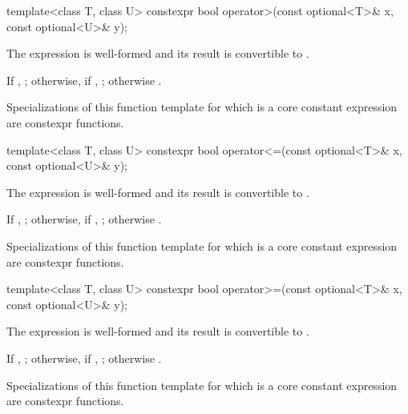 %
\begin{itemdecl}
template<class T, class U>
  constexpr bool operator>(const optional<T>& x, const optional<U>& y);
\end{itemdecl}

\begin{itemdescr}
\pnum
\constraints
The expression  is well-formed and its result is convertible to .

\pnum
\returns
If , ; otherwise, if , ; otherwise .

\pnum
\remarks
Specializations of this function template for which  is a core constant expression are constexpr functions.
\end{itemdescr}

%
\begin{itemdecl}
template<class T, class U>
  constexpr bool operator<=(const optional<T>& x, const optional<U>& y);
\end{itemdecl}

\begin{itemdescr}
\pnum
\constraints
The expression  is well-formed and its result is convertible to .

\pnum
\returns
If , ; otherwise, if , ; otherwise .

\pnum
\remarks
Specializations of this function template for which  is a core constant expression are constexpr functions.
\end{itemdescr}

%
\begin{itemdecl}
template<class T, class U>
  constexpr bool operator>=(const optional<T>& x, const optional<U>& y);
\end{itemdecl}

\begin{itemdescr}
\pnum
\constraints
The expression  is well-formed and its result is convertible to .

\pnum
\returns
If , ; otherwise, if , ; otherwise .

\pnum
\remarks
Specializations of this function template for which  is a core constant expression are constexpr functions.
\end{itemdescr}

